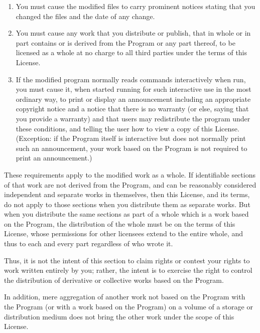 {\begin{multicols}{2}
\begin{enumerate}
\begin{enumerate}

\item
You must cause the modified files to carry prominent notices stating that
you changed the files and the date of any change.

\item
You must cause any work that you distribute or publish, that in
whole or in part contains or is derived from the Program or any
part thereof, to be licensed as a whole at no charge to all third
parties under the terms of this License.

\item
If the modified program normally reads commands interactively
when run, you must cause it, when started running for such
interactive use in the most ordinary way, to print or display an
announcement including an appropriate copyright notice and a
notice that there is no warranty (or else, saying that you provide
a warranty) and that users may redistribute the program under
these conditions, and telling the user how to view a copy of this
License.  (Exception: if the Program itself is interactive but
does not normally print such an announcement, your work based on
the Program is not required to print an announcement.)

\end{enumerate}


These requirements apply to the modified work as a whole.  If
identifiable sections of that work are not derived from the Program,
and can be reasonably considered independent and separate works in
themselves, then this License, and its terms, do not apply to those
sections when you distribute them as separate works.  But when you
distribute the same sections as part of a whole which is a work based
on the Program, the distribution of the whole must be on the terms of
this License, whose permissions for other licensees extend to the
entire whole, and thus to each and every part regardless of who wrote it.

Thus, it is not the intent of this section to claim rights or contest
your rights to work written entirely by you; rather, the intent is to
exercise the right to control the distribution of derivative or
collective works based on the Program.

In addition, mere aggregation of another work not based on the Program
with the Program (or with a work based on the Program) on a volume of
a storage or distribution medium does not bring the other work under
the scope of this License.


\end{enumerate}
\end{multicols}}
